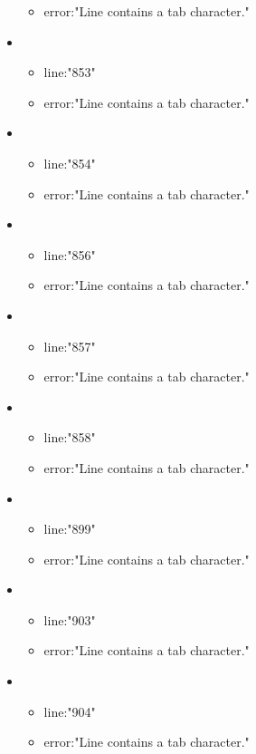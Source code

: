 \begin{itemize}
\begin{itemize}
		\item error:"Line contains a tab character." 
	\end{itemize}
	\item 
	\begin{itemize} 
		\item line:"853" 
		\item error:"Line contains a tab character." 
	\end{itemize}
	\item 
	\begin{itemize} 
		\item line:"854" 
		\item error:"Line contains a tab character." 
	\end{itemize}
	\item 
	\begin{itemize} 
		\item line:"856" 
		\item error:"Line contains a tab character." 
	\end{itemize}
	\item 
	\begin{itemize} 
		\item line:"857" 
		\item error:"Line contains a tab character." 
	\end{itemize}
	\item 
	\begin{itemize} 
		\item line:"858" 
		\item error:"Line contains a tab character." 
	\end{itemize}
	\item 
	\begin{itemize} 
		\item line:"899" 
		\item error:"Line contains a tab character." 
	\end{itemize}
	\item 
	\begin{itemize} 
		\item line:"903" 
		\item error:"Line contains a tab character." 
	\end{itemize}
	\item 
	\begin{itemize} 
		\item line:"904" 
		\item error:"Line contains a tab character." 
	\end{itemize}

\end{itemize}
